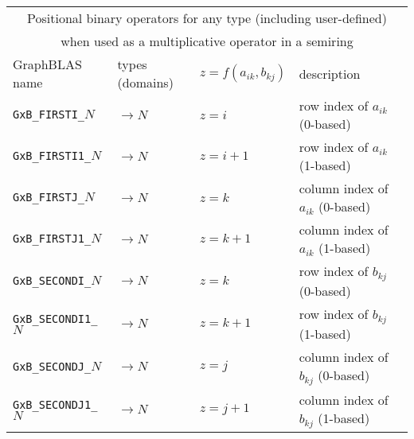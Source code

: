 \documentclass[12pt]{article}
\begin{document}
\vspace{0.2in}
{\footnotesize
\begin{tabular}{|llll|}
\hline
\multicolumn{4}{|c|}{Positional binary operators for any type (including user-defined)} \\
\multicolumn{4}{|c|}{when used as a multiplicative operator in a semiring} \\
\hline
GraphBLAS name            & types (domains)   & $z=f(a_{ik},b_{kj})$      & description \\
\hline
\verb'GxB_FIRSTI_'$N$    & $ \rightarrow N$  & $z = i$       & row index of $a_{ik}$ (0-based) \\
\verb'GxB_FIRSTI1_'$N$   & $ \rightarrow N$  & $z = i+1$     & row index of $a_{ik}$ (1-based) \\
\verb'GxB_FIRSTJ_'$N$    & $ \rightarrow N$  & $z = k$       & column index of $a_{ik}$ (0-based) \\
\verb'GxB_FIRSTJ1_'$N$   & $ \rightarrow N$  & $z = k+1$     & column index of $a_{ik}$ (1-based) \\
\verb'GxB_SECONDI_'$N$   & $ \rightarrow N$  & $z = k$       & row index of $b_{kj}$ (0-based) \\
\verb'GxB_SECONDI1_'$N$  & $ \rightarrow N$  & $z = k+1$     & row index of $b_{kj}$ (1-based) \\
\verb'GxB_SECONDJ_'$N$   & $ \rightarrow N$  & $z = j$       & column index of $b_{kj}$ (0-based) \\
\verb'GxB_SECONDJ1_'$N$  & $ \rightarrow N$  & $z = j+1$     & column index of $b_{kj}$ (1-based) \\
\hline
\end{tabular}
}
\end{document}
